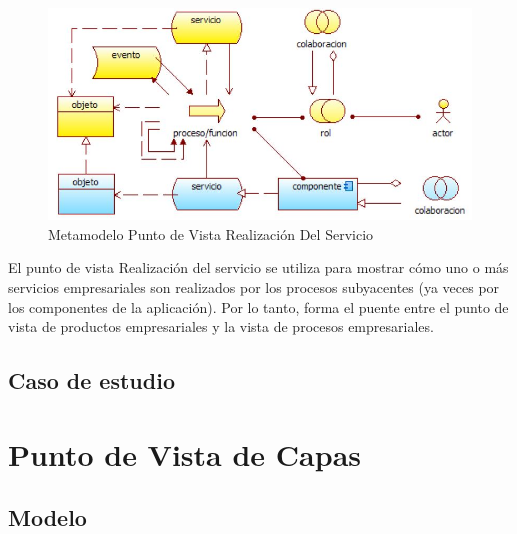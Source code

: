 \begin{figure}[th!]
	\centering
	\includegraphics[width=0.7\linewidth]{arquitectura/imagenes/modeloRealizacionServicio}
	\caption{Metamodelo Punto de Vista Realización Del Servicio}
	\label{metamodeloRealizacionServicio}
\end{figure}
El punto de vista Realización del servicio se utiliza para mostrar cómo uno o más servicios empresariales son realizados por los procesos subyacentes (ya veces por los componentes de la aplicación). Por lo tanto, forma el puente entre el punto de vista de productos empresariales y la vista de procesos empresariales. 

\subsection{Caso de estudio}

\newpage

\section{Punto de Vista de Capas}

\subsection{Modelo}

